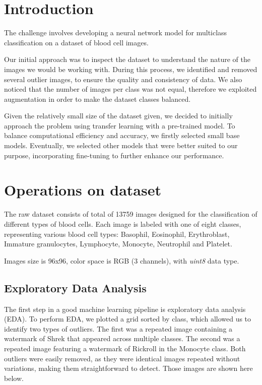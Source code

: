 \documentclass[11pt]{article}
\begin{document}
    \begin{multicols}{2}

        \section{Introduction}
        
        The challenge involves developing a neural network model for multiclass classification on a dataset of blood cell images.
        
        Our initial approach was to inspect the dataset to understand the nature of the images we would be working with. 
        During this process, we identified and removed several outlier images, to ensure the quality and consistency of data. 
        We also noticed that the number of images per class was not equal, therefore we exploited augmentation in order to make the dataset classes balanced.
        
        Given the relatively small size of the dataset given, we decided to initially approach the problem using transfer learning with a pre-trained model.
        To balance computational efficiency and accuracy, we firstly selected small base models.
        Eventually, we selected other models that were better suited to our purpose, incorporating fine-tuning to further enhance our performance.
        
        \section{Operations on dataset}
        The raw dataset consists of total of 13759 images designed for the classification of different types of blood cells. Each image is labeled with one of eight classes, representing various blood cell types: Basophil, Eosinophil, Erythroblast, Immature granulocytes, Lymphocyte, Monocyte, Neutrophil and Platelet.
        
        Images size is 96x96, color space is RGB (3 channels), with \textit{uint8} data type.
        
        \subsection{Exploratory Data Analysis}
        The first step in a good machine learning pipeline is exploratory data analysis (EDA).
        To perform EDA, we plotted a grid sorted by class, which allowed us to identify two types of outliers.
        The first was a repeated image containing a watermark of Shrek that appeared across multiple classes. 
        The second was a repeated image featuring a watermark of Rickroll in the Monocyte class.
        Both outliers were easily removed, as they were identical images repeated without variations, making them straightforward to detect.
        Those images are shown here below.
        

\end{multicols}
\end{document}
